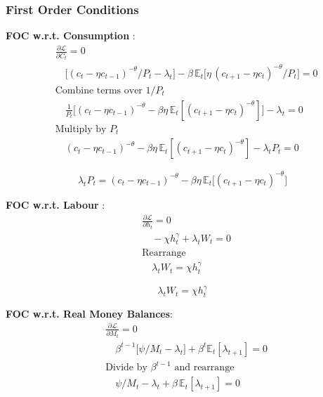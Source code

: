 \documentclass[11pt,preprint]{elsarticle}
\numberwithin{equation}{section}
\numberwithin{figure}{section}
\numberwithin{table}{section}
\begin{document}
\subsubsection{\texorpdfstring{First Order Conditions
\label{household_FOC}}{First Order Conditions }}\label{first-order-conditions}

\textbf{FOC w.r.t. Consumption} : \begin{align*}
  & \frac{\partial \mathcal{L}}{\partial C_t} = 0 \\
  & \quad \bigl[(c_t-\eta c_{t-1})^{-\theta}/P_t - \lambda_t\bigr]
    - \beta\,\mathbb{E}_t\bigl[\eta\,(c_{t+1}-\eta c_t)^{-\theta}/P_t\bigr] = 0 \\[6pt]
  & \text{Combine terms over }1/P_t \\
  & \quad \frac{1}{P_t}\bigl[(c_t-\eta c_{t-1})^{-\theta} - \beta\eta\,\mathbb{E}_t[(c_{t+1}-\eta c_t)^{-\theta}]\bigr] - \lambda_t = 0 \\[6pt]
  & \text{Multiply by }P_t \\
  & \quad (c_t-\eta c_{t-1})^{-\theta} - \beta\eta\,\mathbb{E}_t[(c_{t+1}-\eta c_t)^{-\theta}] - \lambda_t P_t = 0
\end{align*}

\begin{equation}\label{foc_C_app}
\boxed{
  \lambda_t P_t = (c_t-\eta c_{t-1})^{-\theta} - \beta\eta\,\mathbb{E}_t\bigl[(c_{t+1}-\eta c_t)^{-\theta}\bigr]
}
\end{equation}

\textbf{FOC w.r.t. Labour} : \begin{align*}
  & \frac{\partial \mathcal{L}}{\partial h_t} = 0 \\
  & \quad -\chi h_t^{\gamma} + \lambda_t W_t = 0 \\[6pt]
  & \text{Rearrange} \\
  & \quad \lambda_t W_t = \chi h_t^{\gamma}
\end{align*}

\begin{equation}\label{foc_h_app}
\boxed{\lambda_t W_t = \chi h_t^{\gamma}}
\end{equation}

\textbf{FOC w.r.t. Real Money Balances}: \begin{align*}
  & \frac{\partial \mathcal{L}}{\partial M_t} = 0 \\
  & \quad \beta^{t-1}\bigl[\psi/M_t - \lambda_t\bigr] + \beta^t\mathbb{E}_t[\lambda_{t+1}] = 0 \\[6pt]
  & \text{Divide by }\beta^{t-1}\text{ and rearrange} \\
  & \quad \psi/M_t - \lambda_t + \beta\,\mathbb{E}_t[\lambda_{t+1}] = 0
\end{align*}
\end{document}
